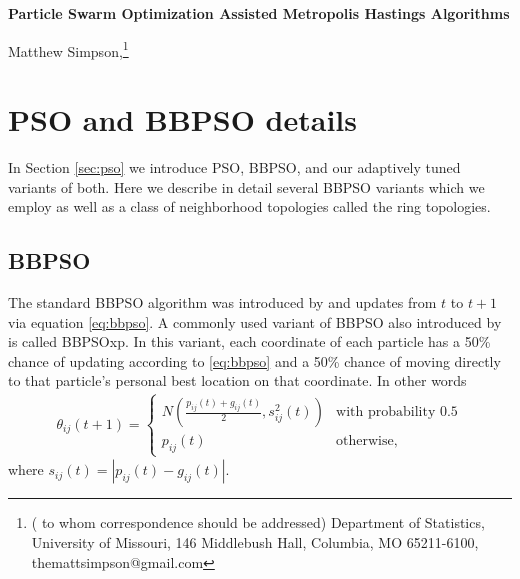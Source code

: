 \documentclass[12pt]{article}
\newcommand{\Appendix}
 {%
 \def\thesection{\Alph{section}}
 \def\thesubsection{\Alph{section}.\arabic{subsection}}
 \def\theequation{\Alph{section}.\arabic{equation}}
 \def\thefigure{\Alph{section}.\arabic{figure}}
 }
\begin{document}
\thispagestyle{empty} \baselineskip=28pt

\thispagestyle{empty} \baselineskip=28pt

%
\begin{center}
{\LARGE{\bf Particle Swarm Optimization Assisted Metropolis Hastings Algorithms}}
\end{center}


\baselineskip=12pt



\vskip 2mm
\blind
{
  \begin{center}
    Matthew Simpson,\footnote{(\baselineskip=10pt to whom correspondence should be addressed)
      Department of Statistics, University of Missouri,
      146 Middlebush Hall, Columbia, MO 65211-6100, themattsimpson@gmail.com}
  \end{center}
} \fi

\clearpage\pagebreak\newpage {}

\baselineskip=24pt

\Appendix
\section{PSO and BBPSO details}\label{app:psodetail}

In Section \ref{sec:pso} we introduce PSO, BBPSO, and our adaptively tuned variants of both. Here we describe in detail several BBPSO variants which we employ as well as a class of neighborhood topologies called the ring topologies.

\subsection{BBPSO}\label{subapp:bbpso}
The standard BBPSO algorithm was introduced by \citet{kennedy2003bare} and updates from $t$ to $t+1$ via equation \eqref{eq:bbpso}. A commonly used variant of BBPSO also introduced by \citet{kennedy2003bare} is called BBPSOxp. In this variant, each coordinate of each particle has a 50\% chance of updating according to \eqref{eq:bbpso} and a 50\% chance of moving directly to that particle's personal best location on that coordinate. In other words
\begin{align}\label{eq:bbpsoxp}
\theta_{ij}(t+1) = \begin{cases} N\left(\frac{p_{ij}(t) + g_{ij}(t)}{2}, s^2_{ij}(t)\right) & \mbox{with probability }0.5\\
p_{ij}(t) &\mbox{otherwise,}\end{cases}
\end{align}
where $s_{ij}(t) = |p_{ij}(t) - g_{ij}(t)|$.
\end{document}

